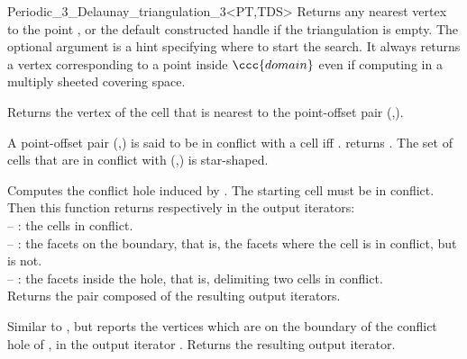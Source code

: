 \begin{ccRefClass}{Periodic_3_Delaunay_triangulation_3<PT,TDS>}
{Returns any nearest vertex to the point , or the default constructed
handle if the triangulation is empty.  The optional argument  is a hint
specifying where to start the search. It always returns a vertex
corresponding to a point inside $\ccc{domain}$ even if computing in a
multiply sheeted covering space.
}

{Returns the  vertex  of the cell  that is nearest to the
  point-offset pair (,).
}

A point-offset pair (,) is said to be in conflict with
a cell  iff \ccVar. returns
. 
The set of cells that are in conflict with (,) is
star-shaped.

{Computes the  conflict hole induced by .  The starting cell
 must be in conflict.  Then this function returns
respectively in the output iterators:\\
-- : the cells in conflict.\\
-- : the facets on the boundary, that is, the facets
 where the cell  is in
conflict, but  is not.\\
-- : the facets inside the hole, that is, delimiting two
cells in conflict.\\
Returns the pair composed of the resulting output iterators.
}

{Similar to , but reports the vertices which are on the
boundary of the conflict hole of , in the output iterator .
Returns the resulting output iterator.
}


\end{ccRefClass}
